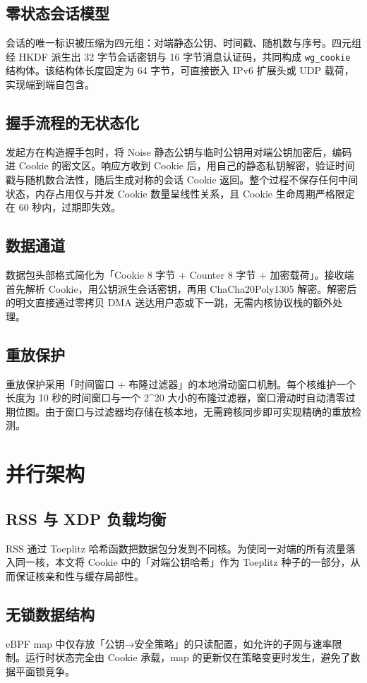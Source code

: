 \section{零状态会话模型}
会话的唯一标识被压缩为四元组：对端静态公钥、时间戳、随机数与序号。四元组经 HKDF 派生出 32 字节会话密钥与 16 字节消息认证码，共同构成 \texttt{wg\_{}cookie} 结构体。该结构体长度固定为 64 字节，可直接嵌入 IPv6 扩展头或 UDP 载荷，实现端到端自包含。\par
\section{握手流程的无状态化}
发起方在构造握手包时，将 Noise 静态公钥与临时公钥用对端公钥加密后，编码进 Cookie 的密文区。响应方收到 Cookie 后，用自己的静态私钥解密，验证时间戳与随机数合法性，随后生成对称的会话 Cookie 返回。整个过程不保存任何中间状态，内存占用仅与并发 Cookie 数量呈线性关系，且 Cookie 生命周期严格限定在 60 秒内，过期即失效。\par
\section{数据通道}
数据包头部格式简化为「Cookie 8 字节 + Counter 8 字节 + 加密载荷」。接收端首先解析 Cookie，用公钥派生会话密钥，再用 ChaCha20Poly1305 解密。解密后的明文直接通过零拷贝 DMA 送达用户态或下一跳，无需内核协议栈的额外处理。\par
\section{重放保护}
重放保护采用「时间窗口 + 布隆过滤器」的本地滑动窗口机制。每个核维护一个长度为 10 秒的时间窗口与一个 2\^{}20 大小的布隆过滤器，窗口滑动时自动清零过期位图。由于窗口与过滤器均存储在核本地，无需跨核同步即可实现精确的重放检测。\par
\chapter{并行架构}
\section{RSS 与 XDP 负载均衡}
RSS 通过 Toeplitz 哈希函数把数据包分发到不同核。为使同一对端的所有流量落入同一核，本文将 Cookie 中的「对端公钥哈希」作为 Toeplitz 种子的一部分，从而保证核亲和性与缓存局部性。\par
\section{无锁数据结构}
eBPF map 中仅存放「公钥→安全策略」的只读配置，如允许的子网与速率限制。运行时状态完全由 Cookie 承载，map 的更新仅在策略变更时发生，避免了数据平面锁竞争。\par
